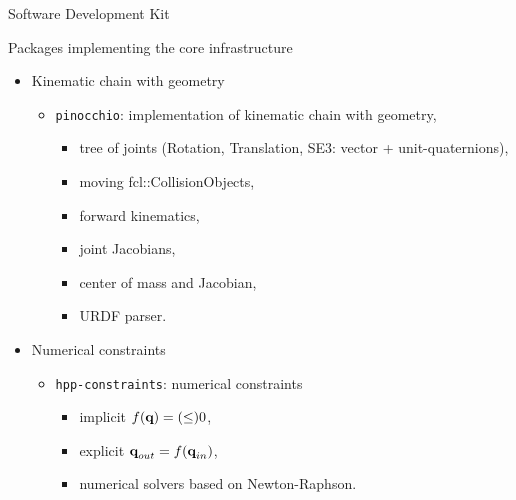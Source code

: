 \begin {frame} {Software Development Kit}

Packages implementing the core infrastructure
\begin{itemize}
\item Kinematic chain with geometry
  \begin{itemize}
  \item \texttt{pinocchio}: implementation of kinematic chain with geometry,
    \begin{itemize}
      \item tree of joints (Rotation, Translation, SE3: vector + unit-quaternions),
      \item moving fcl::CollisionObjects,
      \item forward kinematics,
      \item joint Jacobians,
      \item center of mass and Jacobian,
      \item URDF parser.
    \end{itemize}
  \end{itemize}
  \pause
\item Numerical constraints
  \begin{itemize}
  \item \texttt{hpp-constraints}: numerical constraints
    \begin {itemize}
    \item implicit $f (\textbf{q}) = (\leq) 0$,
    \item explicit $\textbf{q}_{out} = f (\textbf{q}_{in})$,
    \item numerical solvers based on Newton-Raphson.
    \end{itemize}
  \end{itemize}
\end{itemize}
\end {frame}

